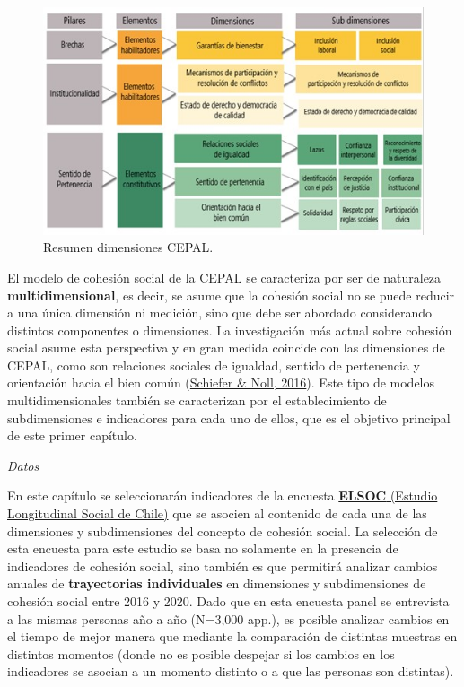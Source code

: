 \documentclass[
  12pt,
]{book}
\begin{document}
\begin{figure}[H]

{\centering \includegraphics[width=1\linewidth,height=1\textheight]{images/dimensiones-cepal} 

}

\caption{Resumen dimensiones CEPAL.}\label{fig:esquema-cepal}
\end{figure}

El modelo de cohesión social de la CEPAL se caracteriza por ser de naturaleza \textbf{multidimensional}, es decir, se asume que la cohesión social no se puede reducir a una única dimensión ni medición, sino que debe ser abordado considerando distintos componentes o dimensiones. La investigación más actual sobre cohesión social asume esta perspectiva y en gran medida coincide con las dimensiones de CEPAL, como son relaciones sociales de igualdad, sentido de pertenencia y orientación hacia el bien común (\protect\hyperlink{ref-schiefer_essentials_2016}{Schiefer \& Noll, 2016}). Este tipo de modelos multidimensionales también se caracterizan por el establecimiento de subdimensiones e indicadores para cada uno de ellos, que es el objetivo principal de este primer capítulo.

\emph{Datos}

En este capítulo se seleccionarán indicadores de la encuesta \href{https://coes.cl/encuesta-panel/}{\textbf{ELSOC} (Estudio Longitudinal Social de Chile)} que se asocien al contenido de cada una de las dimensiones y subdimensiones del concepto de cohesión social. La selección de esta encuesta para este estudio se basa no solamente en la presencia de indicadores de cohesión social, sino también es que permitirá analizar cambios anuales de \textbf{trayectorias individuales} en dimensiones y subdimensiones de cohesión social entre 2016 y 2020. Dado que en esta encuesta panel se entrevista a las mismas personas año a año (N=3,000 app.), es posible analizar cambios en el tiempo de mejor manera que mediante la comparación de distintas muestras en distintos momentos (donde no es posible despejar si los cambios en los indicadores se asocian a un momento distinto o a que las personas son distintas).
\end{document}
